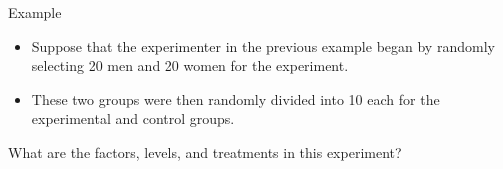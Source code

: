 \begin{frame}{Example}
    \begin{itemize}
        \item Suppose that the experimenter in the previous example began by randomly selecting 20 men and 20 women for the experiment. 
        \item These two groups were then randomly divided into 10 each for the experimental and control groups. 
    \end{itemize}
    What are the factors, levels, and treatments in this experiment?
\end{frame}
